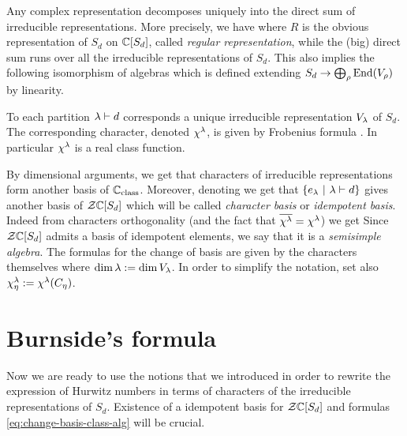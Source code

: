\documentclass[../main/main.tex]{subfiles}
\begin{document}
Any complex representation decomposes uniquely into the direct sum of irreducible representations. More precisely, we have
where $R$ is the obvious representation of $S_d$ on $\mathbb C[S_d]$, called \emph{regular representation}, while the (big) direct sum runs over all the irreducible representations of $S_d$. This also implies the following isomorphism of algebras
which is defined extending $S_d\to\bigoplus_\rho\operatorname{End}(V_\rho)$ by linearity.

\begin{theorem}[{\cite[Thm. 4.3]{FH}}]
	To each partition $\lambda\vdash d$ corresponds a unique irreducible representation $V_\lambda$ of $S_d$. The corresponding character, denoted $\chi^\lambda$, is given by Frobenius formula \cite[Eq. 4.10]{FH}. In particular $\chi^\lambda$ is a real class function.
\end{theorem}

By dimensional arguments, we get that characters of irreducible representations form another basis of $\mathbb C_{\text{class}}$. Moreover, denoting
we get that $\{e_\lambda\ |\ \lambda\vdash d\}$ gives another basis of $\mathcal Z\mathbb C[S_d]$
which will be called \emph{character basis} or \emph{idempotent basis}. Indeed from characters orthogonality (and the fact that $\overline{\chi^\lambda}=\chi^\lambda$) we get
Since $\mathcal Z\mathbb C[S_d]$ admits a basis of idempotent elements, we say that it is a \emph{semisimple algebra}. The formulas for the change of basis are given by the characters themselves
where $\dim \lambda:=\dim V_\lambda$. In order to simplify the notation, set also $\chi^\lambda_\eta:=\chi^\lambda(C_\eta)$. 

\section{Burnside's formula}

Now we are ready to use the notions that we introduced in order to rewrite the expression of Hurwitz numbers in terms of characters of the irreducible representations of $S_d$. Existence of a idempotent basis for $\mathcal Z\mathbb C[S_d]$ and formulas \eqref{eq:change-basis-class-alg} will be crucial. 
\end{document}
